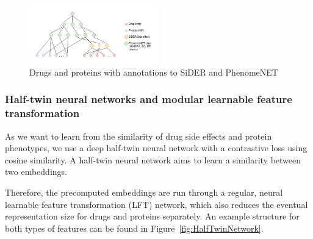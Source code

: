\documentclass{bioinfo}
\begin{document}

\begin{figure}[!tpb]%
	\centerline{\includegraphics[width=0.5\textwidth]{figures/drug_protein_ontology_network.png}}
	\caption{Drugs and proteins with annotations to SiDER and PhenomeNET}
	\label{fig:Onto}
\end{figure}


\subsubsection{Half-twin neural networks and modular learnable feature transformation}


As we want to learn from the similarity of drug side effects and
protein phenotypes, we use a deep half-twin neural network with
a contrastive loss using cosine similarity.
A half-twin neural network aims to learn a similarity between two
embeddings.


Therefore, the precomputed embeddings are run through a regular,
neural learnable feature transformation (LFT) network, which also
reduces the eventual representation size for drugs and proteins
separately. An example structure for both types of features can be
found in Figure~\ref{fig:HalfTwinNetwork}.
\end{document}
